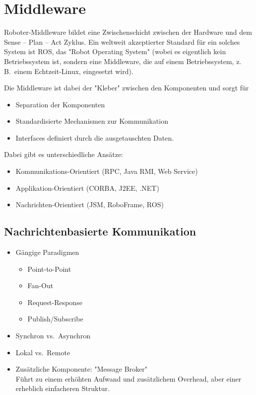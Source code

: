 \documentclass[a4paper, 11pt, accentcolor = tud3b]{tudreport}
\newcommand{\zB}{z.\,B.~}
\newcommand{\vs}{vs.~}
\begin{document}
		\section{Middleware}
			Roboter-Middleware bildet eine Zwischenschicht zwischen der Hardware und dem Sense -- Plan -- Act Zyklus. Ein weltweit akzeptierter Standard für ein solches System ist ROS, das "Robot Operating System" (wobei es eigentlich kein Betriebssystem ist, sondern eine Middleware, die auf einem Betriebssystem, \zB einem Echtzeit-Linux, eingesetzt wird).
			
			Die Middleware ist dabei der "Kleber" zwischen den Komponenten und sorgt für
			\begin{itemize}
				\item Separation der Komponenten
				\item Standardisierte Mechanismen zur Kommunikation
				\item Interfaces definiert durch die ausgetauschten Daten.
			\end{itemize}
			Dabei gibt es unterschiedliche Ansätze:
			\begin{itemize}
				\item Kommunikations-Orientiert (RPC, Java RMI, Web Service)
				\item Applikation-Orientiert (CORBA, J2EE, .NET)
				\item Nachrichten-Orientiert (JSM, RoboFrame, ROS)
			\end{itemize}

			\subsection{Nachrichtenbasierte Kommunikation}
				\begin{itemize}
					\item Gängige Paradigmen
						\begin{itemize}
							\item Point-to-Point
							\item Fan-Out
							\item Request-Response
							\item Publish/Subscribe
						\end{itemize}
					\item Synchron \vs Asynchron
					\item Lokal \vs Remote
					\item Zusätzliche Komponente: "Message Broker" \\ Führt zu einem erhöhten Aufwand und zusätzlichem Overhead, aber einer erheblich einfacheren Struktur.
				\end{itemize}
\end{document}
